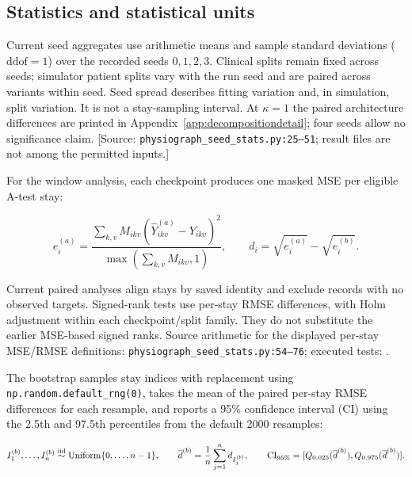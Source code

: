 \subsection{Statistics and statistical units}


Current seed aggregates use arithmetic means and sample standard deviations ($\mathrm{ddof}=1$) over the recorded seeds $0,1,2,3$. Clinical splits remain fixed across seeds; simulator patient splits vary with the run seed and are paired across variants within seed. Seed spread describes fitting variation and, in simulation, split variation. It is not a stay-sampling interval. At $\kappa=1$ the paired architecture differences are printed in Appendix~\ref{app:decompositiondetail}; four seeds allow no significance claim. [Source: \texttt{physiograph\_\allowbreak{}seed\_\allowbreak{}stats.\allowbreak{}py:\allowbreak{}25–\allowbreak{}51}; result files are not among the permitted inputs.]

For the window analysis, each checkpoint produces one masked MSE per eligible A-test stay:

\[
e_i^{(a)}=\frac{\sum_{k,v}M_{ikv}(\widehat Y^{(a)}_{ikv}-Y_{ikv})^2}{\max(\sum_{k,v}M_{ikv},1)},\qquad
d_i=\sqrt{e_i^{(a)}}-\sqrt{e_i^{(b)}}.
\]


Current paired analyses align stays by saved identity and exclude records with no observed targets. Signed-rank tests use per-stay RMSE differences, with Holm adjustment within each checkpoint/split family. They do not substitute the earlier MSE-based signed ranks. Source arithmetic for the displayed per-stay MSE/RMSE definitions: \texttt{physiograph\_seed\_stats.py:54--76}; executed tests: .

The bootstrap samples stay indices with replacement using \texttt{np.\allowbreak{}random.\allowbreak{}default\_\allowbreak{}rng(0)}, takes the mean of the paired per-stay RMSE differences for each resample, and reports a 95\% confidence interval (CI) using the 2.5th and 97.5th percentiles from the default 2000 resamples:

\[
I^{(b)}_1,\ldots,I^{(b)}_n\stackrel{\rm iid}{\sim}\operatorname{Uniform}\{0,\ldots,n-1\},\qquad
\overline d^{(b)}=\frac1n\sum_{j=1}^n d_{I_j^{(b)}},\qquad
\mathrm{CI}_{95\%}=[Q_{0.025}(\overline d^{(b)}),Q_{0.975}(\overline d^{(b)})].
\]


